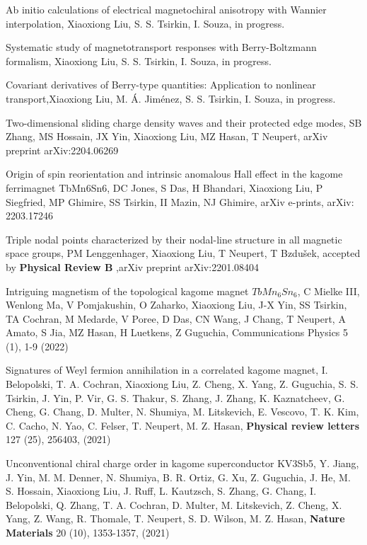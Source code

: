 \documentclass[11pt,a4paper,sans]{moderncv} %
\begin{document}
\begin{etaremune}
  \item Ab initio calculations of electrical magnetochiral anisotropy with Wannier interpolation, \textcolor{cvblue}{Xiaoxiong Liu}, S. S. Tsirkin, I. Souza, in progress.
  \item Systematic study of magnetotransport responses with Berry-Boltzmann formalism, \textcolor{cvblue}{Xiaoxiong Liu}, S. S. Tsirkin, I. Souza, in progress.
  \item Covariant derivatives of Berry-type quantities: Application to nonlinear transport,\textcolor{cvblue}{Xiaoxiong Liu}, M. Á. Jiménez, S. S. Tsirkin, I. Souza, in progress.
  \item Two-dimensional sliding charge density waves and their protected edge modes, SB Zhang, MS Hossain, JX Yin, \textcolor{cvblue}{Xiaoxiong Liu}, MZ Hasan, T Neupert, arXiv preprint arXiv:2204.06269
  \item Origin of spin reorientation and intrinsic anomalous Hall effect in the kagome ferrimagnet TbMn6Sn6, DC Jones, S Das, H Bhandari, \textcolor{cvblue}{Xiaoxiong Liu}, P Siegfried, MP Ghimire, SS Tsirkin, II Mazin, NJ Ghimire, arXiv e-prints, arXiv: 2203.17246
  \item Triple nodal points characterized by their nodal-line structure in all magnetic space groups, PM Lenggenhager, \textcolor{cvblue}{Xiaoxiong Liu}, T Neupert, T Bzdušek, accepted by \textbf{Physical Review B} ,arXiv preprint arXiv:2201.08404
  \item Intriguing magnetism of the topological kagome magnet $TbMn_6Sn_6$, C Mielke III, Wenlong Ma, V Pomjakushin, O Zaharko, \textcolor{cvblue}{Xiaoxiong Liu}, J-X Yin, SS Tsirkin, TA Cochran, M Medarde, V Poree, D Das, CN Wang, J Chang, T Neupert, A Amato, S Jia, MZ Hasan, H Luetkens, Z Guguchia, Communications Physics 5 (1), 1-9 (2022)
  \item Signatures of Weyl fermion annihilation in a correlated kagome magnet, I. Belopolski, T. A. Cochran, \textcolor{cvblue}{Xiaoxiong Liu}, Z. Cheng, X. Yang, Z. Guguchia, S. S. Tsirkin, J. Yin, P. Vir, G. S. Thakur, S. Zhang, J. Zhang, K. Kaznatcheev, G. Cheng, G. Chang, D. Multer, N. Shumiya, M. Litskevich, E. Vescovo, T. K. Kim, C. Cacho, N. Yao, C. Felser, T. Neupert, M. Z. Hasan, \textbf{Physical review letters} 127 (25), 256403, (2021)
  \item Unconventional chiral charge order in kagome superconductor KV3Sb5, Y. Jiang, J. Yin, M. M. Denner, N. Shumiya, B. R. Ortiz, G. Xu, Z. Guguchia, J. He, M. S. Hossain, \textcolor{cvblue}{Xiaoxiong Liu}, J. Ruff, L. Kautzsch, S. Zhang, G. Chang, I. Belopolski, Q. Zhang, T. A. Cochran, D. Multer, M. Litskevich, Z. Cheng, X. Yang, Z. Wang, R. Thomale, T. Neupert, S. D. Wilson, M. Z. Hasan, \textbf{Nature Materials} 20 (10), 1353-1357, (2021)

\end{etaremune}
\end{document}
